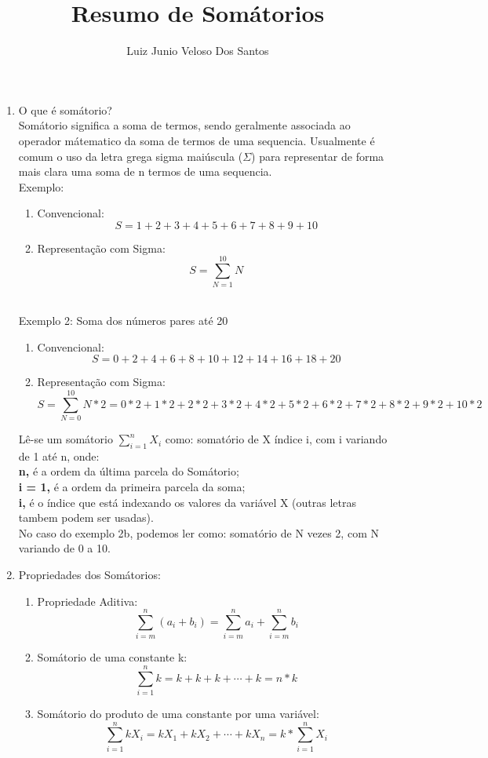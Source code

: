 \documentclass[12pt]{article}
\title{Resumo de Somátorios}
\author{Luiz Junio Veloso Dos Santos}
\begin{document}
 

\maketitle

\begin{enumerate}
    \item O que é somátorio?
    \\
    Somátorio significa a soma de termos, sendo geralmente associada ao operador mátematico da soma de termos
    de uma sequencia. Usualmente é comum o uso da letra grega sigma maiúscula ($\Sigma$) para representar de forma mais clara uma
    soma de n termos de uma sequencia.\\
    Exemplo:
    \begin{enumerate}
        \item Convencional:
            $$S = 1 + 2 + 3 + 4 + 5 + 6 + 7 + 8 + 9 + 10$$
        \item Representação com Sigma:
            $$S = \sum_{N = 1}^{10} N $$
    \end{enumerate}
    ~\\ Exemplo 2: Soma dos números pares até 20
    \begin{enumerate}
        \item Convencional:
            $$ S = 0 + 2 + 4 + 6 + 8 + 10 + 12 + 14 + 16 + 18 + 20 $$
        \item Representação com Sigma:
            $$ 
            S = \sum_{N = 0}^{10} N * 2 = 0*2 + 1*2 + 2*2 + 3*2 + 4*2 + 5*2 + 6*2 + 7*2 + 8*2 + 9*2 + 10*2
            $$
        \end{enumerate}
            Lê-se um somátorio $\sum\limits_{i = 1}^{n} X_i$   como: somatório de X índice i, com i
            variando de 1 até n, onde:\\
            \textbf{n,} é a ordem da última parcela do Somátorio;
            \\
            \textbf{i = 1,} é a ordem da primeira parcela da soma;
            \\
            \textbf{i,} é o índice que está indexando os valores da variável X (outras letras tambem podem
            ser usadas).
            \\
            No caso do exemplo 2b, podemos ler como: somatório de N vezes 2, com N
            variando de 0 a 10.
            \newpage
        \item Propriedades dos Somátorios:
            \begin{enumerate}
                \item Propriedade Aditiva:
                    $$\sum_{i=m}^{n}(a_i + b_i) = \sum_{i=m}^{n} a_i  + \sum_{i=m}^{n} b_i$$
                \item Somátorio de uma constante k:
                        $$\sum_{i=1}^{n} k = k + k + k +\cdots+ k = n*k$$
                \item Somátorio do produto de uma constante por uma variável:
                    $$\sum_{i=1}^{n} kX_i = kX_1 + kX_2 + \cdots + kX_n = k * \sum_{i=1}^{n} X_i$$
            \end{enumerate}
        
\end{enumerate}



\end{document}
